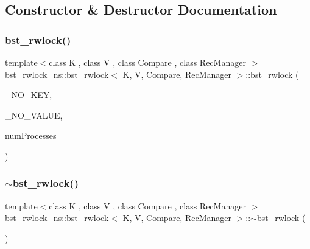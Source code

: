 \subsection{Constructor \& Destructor Documentation}
\mbox{\label{classbst__rwlock__ns_1_1bst__rwlock_a8d8cc1557bc6491508dcfacaf12c9db1}} 
\subsubsection{\texorpdfstring{bst\+\_\+rwlock()}{bst\_rwlock()}\hspace{0.1cm}{\footnotesize\ttfamily [1/2]}}
{\footnotesize\ttfamily template$<$class K , class V , class Compare , class Rec\+Manager $>$ \\
\hyperlink{classbst__rwlock__ns_1_1bst__rwlock}{bst\+\_\+rwlock\+\_\+ns\+::bst\+\_\+rwlock}$<$ K, V, Compare, Rec\+Manager $>$\+::\hyperlink{classbst__rwlock__ns_1_1bst__rwlock}{bst\+\_\+rwlock} (\begin{DoxyParamCaption}\item[{const K}]{\+\_\+\+N\+O\+\_\+\+K\+EY,  }\item[{const V}]{\+\_\+\+N\+O\+\_\+\+V\+A\+L\+UE,  }\item[{const int}]{num\+Processes }\end{DoxyParamCaption})\hspace{0.3cm}{\ttfamily [inline]}}

\mbox{\label{classbst__rwlock__ns_1_1bst__rwlock_aeced6e42f96359b65eeb496563af89a6}} 
\subsubsection{\texorpdfstring{$\sim$bst\+\_\+rwlock()}{~bst\_rwlock()}\hspace{0.1cm}{\footnotesize\ttfamily [1/2]}}
{\footnotesize\ttfamily template$<$class K , class V , class Compare , class Rec\+Manager $>$ \\
\hyperlink{classbst__rwlock__ns_1_1bst__rwlock}{bst\+\_\+rwlock\+\_\+ns\+::bst\+\_\+rwlock}$<$ K, V, Compare, Rec\+Manager $>$\+::$\sim$\hyperlink{classbst__rwlock__ns_1_1bst__rwlock}{bst\+\_\+rwlock} (\begin{DoxyParamCaption}{ }\end{DoxyParamCaption})\hspace{0.3cm}{\ttfamily [inline]}}

